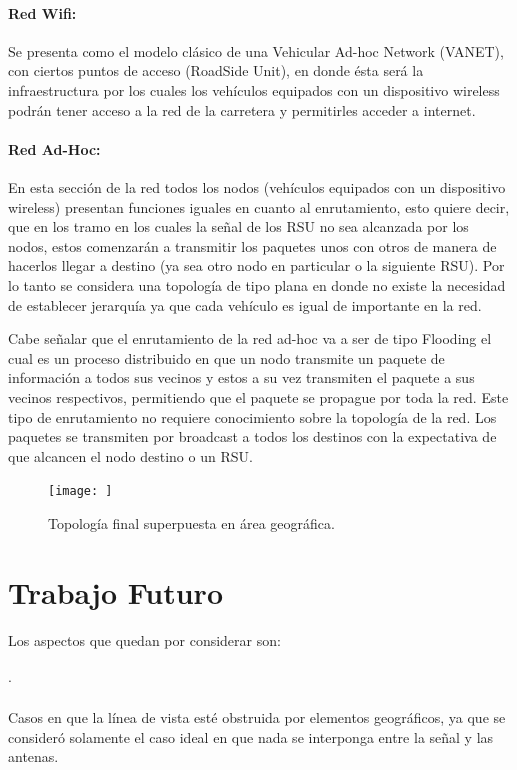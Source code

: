 \documentclass[12pt]{article}
\begin{document}
\paragraph{Red Wifi:} 
Se presenta como el modelo clásico de una Vehicular Ad-hoc Network (VANET), con ciertos puntos de acceso 
(RoadSide Unit), en donde ésta será la infraestructura por los cuales los vehículos equipados con un
dispositivo wireless podrán tener acceso a la red de la carretera y permitirles acceder a internet.

\paragraph{Red Ad-Hoc:}
En esta sección de la red todos los nodos (vehículos equipados con un dispositivo wireless) presentan 
funciones iguales en cuanto al enrutamiento, esto quiere decir, que en los tramo en los cuales la señal de 
los RSU no sea alcanzada por los nodos, estos comenzarán a transmitir los paquetes unos con otros de manera 
de hacerlos llegar a destino (ya sea otro nodo en particular o la siguiente RSU). Por lo tanto se considera 
una topología de tipo plana en donde no existe la necesidad de establecer jerarquía ya que cada vehículo es 
igual de importante en la red.

Cabe señalar que el enrutamiento de la red ad-hoc va a ser de tipo Flooding el cual es un proceso 
distribuido en que un nodo transmite un paquete de información a todos sus vecinos y estos a su vez 
transmiten el paquete a sus vecinos respectivos, permitiendo que el paquete se propague por toda la red. 
Este tipo de enrutamiento no requiere conocimiento sobre la topología de la red. Los paquetes se 
transmiten por broadcast a todos los destinos con la expectativa de que alcancen el nodo destino o un RSU.

\begin{figure}[H]
  \centering
      \texttt{[image: ]}
	    \caption{Topología final superpuesta en área geográfica.}
	\label{fig:top_final}
\end{figure}

\newpage
\section{Trabajo Futuro}
Los aspectos que quedan por considerar son:\\
\paragraph{$\cdot$}Casos en que la línea de vista esté obstruida por elementos geográficos, ya que se 
consideró solamente el caso ideal en que nada se interponga entre la señal y las antenas.
\end{document}

